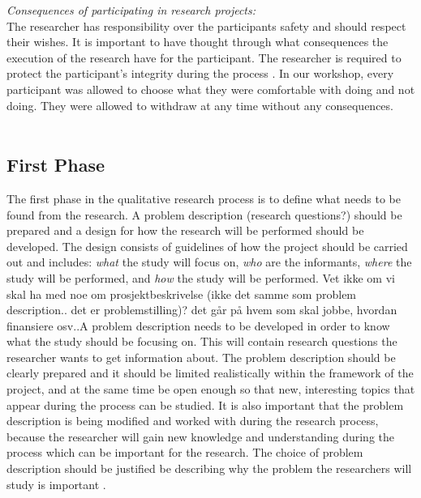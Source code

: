 \emph{Consequences of participating in research projects:}\\
The researcher has responsibility over the participants safety and should respect their wishes. It is important to have thought through what consequences the execution of the research have for the participant. The researcher is required to protect the participant's integrity during the process \cite{qualitative}. In our workshop, every participant was allowed to choose what they were comfortable with doing and not doing. They were allowed to withdraw at any time without any consequences.  \\ \\
\subsection{First Phase} 
The first phase in the qualitative research process is to define what needs to be found from the research. A problem description (research questions?) should be prepared and a design for how the research will be performed should be developed. The design consists of guidelines of how the project should be carried out and includes: \emph{what} the study will focus on, \emph{who} are the informants, \emph{where} the study will be performed, and \emph{how} the study will be performed. Vet ikke om vi skal ha med noe om prosjektbeskrivelse (ikke det samme som problem description.. det er problemstilling)? det går på hvem som skal jobbe, hvordan finansiere osv..A problem description needs to be developed in order to know what the study should be focusing on. This will contain research questions the researcher wants to get information about. The problem description should be clearly prepared and it should be limited realistically within the framework of the project, and at the same time be open enough so that new, interesting topics that appear during the process can be studied. It is also important that the problem description is being modified and worked with during the research process, because the researcher will gain new knowledge and understanding during the process which can be important for the research. The choice of problem description should be justified be describing why the problem the researchers will study is important \cite{qualitative}. 
